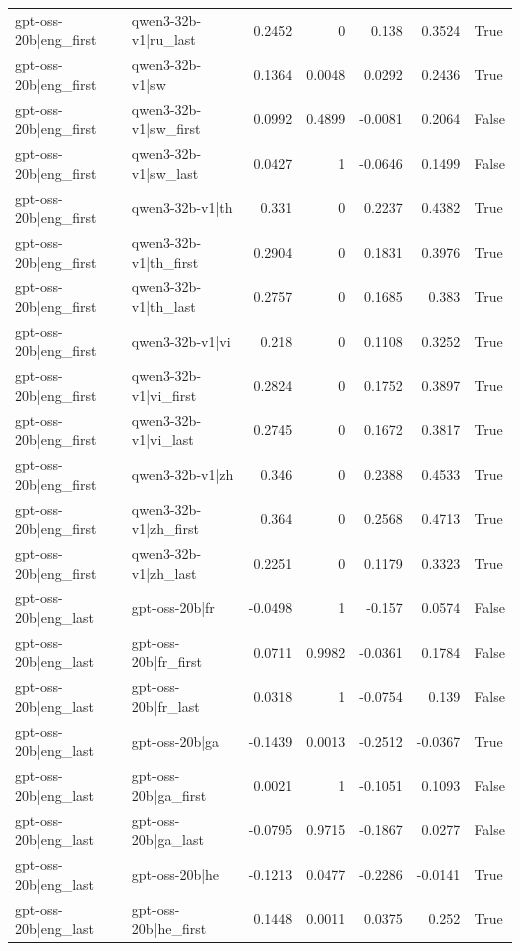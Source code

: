 \begin{table}
\begin{tabular}{l l r r r r l}
gpt-oss-20b|eng_first & qwen3-32b-v1|ru_last & 0.2452 & 0 & 0.138 & 0.3524 & True \\
gpt-oss-20b|eng_first & qwen3-32b-v1|sw & 0.1364 & 0.0048 & 0.0292 & 0.2436 & True \\
gpt-oss-20b|eng_first & qwen3-32b-v1|sw_first & 0.0992 & 0.4899 & -0.0081 & 0.2064 & False \\
gpt-oss-20b|eng_first & qwen3-32b-v1|sw_last & 0.0427 & 1 & -0.0646 & 0.1499 & False \\
gpt-oss-20b|eng_first & qwen3-32b-v1|th & 0.331 & 0 & 0.2237 & 0.4382 & True \\
gpt-oss-20b|eng_first & qwen3-32b-v1|th_first & 0.2904 & 0 & 0.1831 & 0.3976 & True \\
gpt-oss-20b|eng_first & qwen3-32b-v1|th_last & 0.2757 & 0 & 0.1685 & 0.383 & True \\
gpt-oss-20b|eng_first & qwen3-32b-v1|vi & 0.218 & 0 & 0.1108 & 0.3252 & True \\
gpt-oss-20b|eng_first & qwen3-32b-v1|vi_first & 0.2824 & 0 & 0.1752 & 0.3897 & True \\
gpt-oss-20b|eng_first & qwen3-32b-v1|vi_last & 0.2745 & 0 & 0.1672 & 0.3817 & True \\
gpt-oss-20b|eng_first & qwen3-32b-v1|zh & 0.346 & 0 & 0.2388 & 0.4533 & True \\
gpt-oss-20b|eng_first & qwen3-32b-v1|zh_first & 0.364 & 0 & 0.2568 & 0.4713 & True \\
gpt-oss-20b|eng_first & qwen3-32b-v1|zh_last & 0.2251 & 0 & 0.1179 & 0.3323 & True \\
gpt-oss-20b|eng_last & gpt-oss-20b|fr & -0.0498 & 1 & -0.157 & 0.0574 & False \\
gpt-oss-20b|eng_last & gpt-oss-20b|fr_first & 0.0711 & 0.9982 & -0.0361 & 0.1784 & False \\
gpt-oss-20b|eng_last & gpt-oss-20b|fr_last & 0.0318 & 1 & -0.0754 & 0.139 & False \\
gpt-oss-20b|eng_last & gpt-oss-20b|ga & -0.1439 & 0.0013 & -0.2512 & -0.0367 & True \\
gpt-oss-20b|eng_last & gpt-oss-20b|ga_first & 0.0021 & 1 & -0.1051 & 0.1093 & False \\
gpt-oss-20b|eng_last & gpt-oss-20b|ga_last & -0.0795 & 0.9715 & -0.1867 & 0.0277 & False \\
gpt-oss-20b|eng_last & gpt-oss-20b|he & -0.1213 & 0.0477 & -0.2286 & -0.0141 & True \\
gpt-oss-20b|eng_last & gpt-oss-20b|he_first & 0.1448 & 0.0011 & 0.0375 & 0.252 & True \\

\end{tabular}
\end{table}
